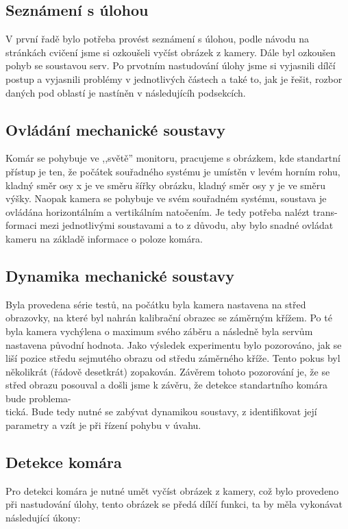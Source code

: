 \documentclass[a4paper,10pt]{article}
\begin{document}
\subsection{Seznámení s úlohou}

V první řadě bylo potřeba provést seznámení s úlohou, podle návodu na stránkách cvičení \cite{web} jsme si ozkoušeli vyčíst obrázek z kamery. Dále byl ozkoušen pohyb se soustavou serv. Po prvotním nastudování úlohy jsme si vyjasnili dílčí postup a vyjasnili problémy v jednotlivých částech a také to, jak je řešit, rozbor daných pod oblastí je nastíněn v následujícíh podsekcích.

\subsection{Ovládání mechanické soustavy}
Komár se pohybuje ve ,,světě'' monitoru, pracujeme s obrázkem, kde standartní přístup je ten, že počátek souřadného systému je umístěn v levém horním rohu, kladný směr osy x je ve směru šířky obrázku, kladný směr osy y je ve směru výšky. Naopak kamera se pohybuje ve svém souřadném systému, soustava je ovládána horizontálním a vertikálním natočením. Je tedy potřeba nalézt trans-\\formaci mezi jednotlivými soustavami a to z důvodu, aby bylo snadné ovládat kameru na základě informace o poloze komára.

\subsection{Dynamika mechanické soustavy}
Byla provedena série testů, na počátku byla kamera nastavena na střed obrazovky, na které byl nahrán kalibrační obrazec se záměrným křížem. Po té byla kamera vychýlena o maximum svého záběru a následně byla servům nastavena původní hodnota. Jako výsledek experimentu bylo pozorováno, jak se liší pozice středu sejmutého obrazu od středu záměrného kříže. Tento pokus byl několikrát (řádově desetkrát) zopakován. Závěrem tohoto pozorování je, že se střed obrazu posouval a došli jsme k závěru, že detekce standartního komára bude problema-\\tická. Bude tedy nutné se zabývat dynamikou soustavy, z identifikovat její parametry a vzít je při řízení pohybu v úvahu.

\subsection{Detekce komára}
Pro detekci komára je nutné umět vyčíst obrázek z kamery, což bylo provedeno při nastudování úlohy, tento obrázek se předá dílčí funkci, ta by měla vykonávat následující úkony:
\end{document}
